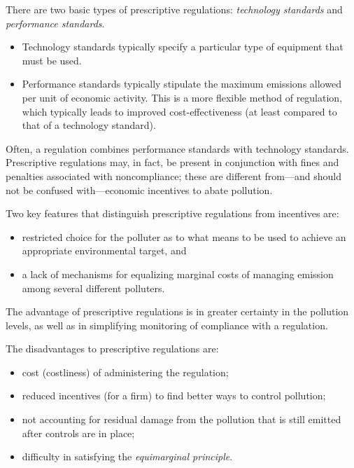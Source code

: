 \documentclass[
]{book}
\providecommand{\tightlist}{%
  \setlength{\itemsep}{0pt}\setlength{\parskip}{0pt}}
\begin{document}
There are two basic types of prescriptive regulations: \emph{technology standards} and \emph{performance standards}.

\begin{itemize}
\tightlist
\item
  Technology standards typically specify a particular type of equipment that must be used.
\item
  Performance standards typically stipulate the maximum emissions allowed per unit of economic activity. This is a more flexible method of regulation, which typically leads to improved cost-effectiveness (at least compared to that of a technology standard).
\end{itemize}

Often, a regulation combines performance standards with technology standards. Prescriptive regulations may, in fact, be present in conjunction with fines and penalties associated with noncompliance; these are different from---and should not be confused with---economic incentives to abate pollution.

Two key features that distinguish prescriptive regulations from incentives are:

\begin{itemize}
\tightlist
\item
  restricted choice for the polluter as to what means to be used to achieve an appropriate environmental target, and
\item
  a lack of mechanisms for equalizing marginal costs of managing emission among several different polluters.
\end{itemize}

The advantage of prescriptive regulations is in greater certainty in the pollution levels, as well as in simplifying monitoring of compliance with a regulation.

The disadvantages to prescriptive regulations are:

\begin{itemize}
\tightlist
\item
  cost (costliness) of administering the regulation;
\item
  reduced incentives (for a firm) to find better ways to control pollution;
\item
  not accounting for residual damage from the pollution that is still emitted after controls are in place;
\item
  difficulty in satisfying the \emph{equimarginal principle}.
\end{itemize}
\end{document}
